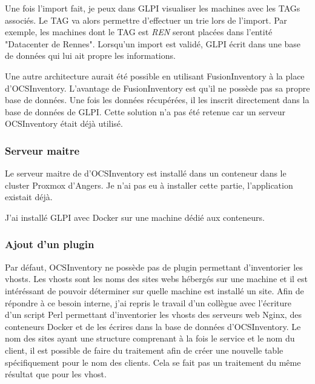 \documentclass[12pt]{article}
\begin{document}
Une fois l'import fait, je peux dans GLPI visualiser les machines avec les TAGs associés. 
Le TAG va alors permettre d'effectuer un trie lors de l'import. 
Par exemple, les machines dont le TAG est \textit{REN} seront placées dans l'entité "Datacenter de Rennes".
Lorsqu'un import est validé, GLPI écrit dans une base de données qui lui ait propre les informations.

Une autre architecture aurait été possible en utilisant FusionInventory à la place d'OCSInventory. 
L'avantage de FusionInventory est qu'il ne possède pas sa propre base de données. 
Une fois les données récupérées, il les inscrit directement dans la base de données de GLPI. 
Cette solution n'a pas été retenue car un serveur OCSInventory était déjà utilisé.

\subsubsection{Serveur maitre}
Le serveur maitre de d'OCSInventory est installé dans un conteneur dans le cluster Proxmox d'Angers.
Je n'ai pas eu à installer cette partie, l'application existait déjà.

J'ai installé GLPI avec Docker sur une machine dédié aux conteneurs.

\subsubsection{Ajout d'un plugin}
Par défaut, OCSInventory ne possède pas de plugin permettant d'inventorier les vhosts. 
Les vhosts sont les noms des sites webs hébergés sur une machine et il est intéréssant de pouvoir déterminer sur quelle machine est installé un site. 
Afin de répondre à ce besoin interne, j'ai repris le travail d'un collègue avec l'écriture d'un script Perl permettant d'inventorier les vhosts des serveurs web Nginx, des conteneurs Docker et de les écrires dans la base de données d'OCSInventory.
Le nom des sites ayant une structure comprenant à la fois le service et le nom du client, il est possible de faire du traitement afin de créer une nouvelle table spécifiquement pour le nom des clients.
Cela se fait pas un traitement du même résultat que pour les vhost.
\end{document}
